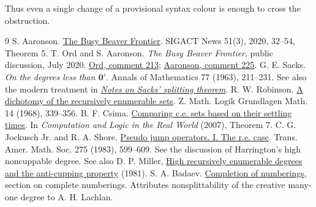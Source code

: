 \documentclass[11pt]{article}
\begin{document}
Thus even a single change of a provisional syntax colour is enough to cross the obstruction.

\begin{thebibliography}{9}
 S. Aaronson. \href{https://doi.org/10.1145/3427361.3427369}{The Busy Beaver Frontier}. SIGACT News 51(3), 2020, 32--54, Theorem 5.
 T. Ord and S. Aaronson. \emph{The Busy Beaver Frontier}, public discussion, July 2020. \href{https://scottaaronson.blog/?p=4916\#comment-1851063}{Ord, comment 213}; \href{https://scottaaronson.blog/?p=4916\#comment-1851125}{Aaronson, comment 225}.
 G. E. Sacks. \emph{On the degrees less than $\mathbf 0'$}. Annals of Mathematics 77 (1963), 211--231. See also the modern treatment in \href{https://www.cambridge.org/core/journals/journal-of-symbolic-logic/article/notes-on-sacks-splitting-theorem/0ACA242AC51502CAF19C405DDD2C54AE}{\emph{Notes on Sacks' splitting theorem}}.
 R. W. Robinson. \href{https://doi.org/10.1002/malq.19680142105}{A dichotomy of the recursively enumerable sets}. Z. Math. Logik Grundlagen Math. 14 (1968), 339--356.
 B. F. Csima. \href{https://www.math.uwaterloo.ca/~csima/papers/siennast2.pdf}{Comparing c.e. sets based on their settling times}. In \emph{Computation and Logic in the Real World} (2007), Theorem 7.
 C. G. Jockusch Jr. and R. A. Shore. \href{https://doi.org/10.1090/S0002-9947-1983-0682720-1}{Pseudo jump operators. I. The r.e. case}. Trans. Amer. Math. Soc. 275 (1983), 599--609. See the discussion of Harrington's high noncuppable degree. See also D. P. Miller, \href{https://doi.org/10.1007/BFb0090950}{High recursively enumerable degrees and the anti-cupping property} (1981).
 S. A. Badaev. \href{https://www.math.uni.wroc.pl/~pkowa/slides/badaev.pdf}{Completion of numberings}, section on complete numberings. Attributes nonsplittability of the creative many-one degree to A. H. Lachlan.
\end{thebibliography}
\end{document}
